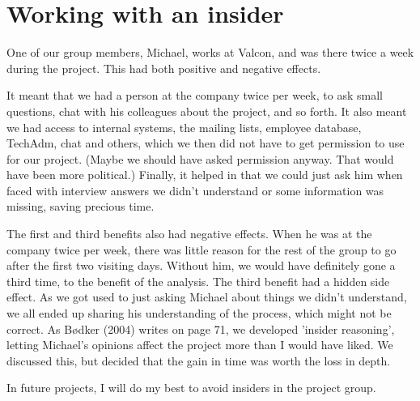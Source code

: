 \section{Working with an insider}
One of our group members, Michael, works at Valcon, and was there twice a week during the project.
This had both positive and negative effects.

It meant that we had a person at the company twice per week, to ask small questions, chat with his colleagues about the project, and so forth.
It also meant we had access to internal systems, the mailing lists, employee database, TechAdm, chat and others, which we then did not have to get permission to use for our project.
(Maybe we should have asked permission anyway. That would have been more political.)
Finally, it helped in that we could just ask him when faced with interview answers we didn't understand or some information was missing, saving precious time.

The first and third benefits also had negative effects.
When he was at the company twice per week, there was little reason for the rest of the group to go after the first two visiting days.
Without him, we would have definitely gone a third time, to the benefit of the analysis.
The third benefit had a hidden side effect.
As we got used to just asking Michael about things we didn't understand, we all ended up sharing his understanding of the process, which might not be correct.
As Bødker (2004) writes on page 71, we developed 'insider reasoning', letting Michael's opinions affect the project more than I would have liked.
We discussed this, but decided that the gain in time was worth the loss in depth.

In future projects, I will do my best to avoid insiders in the project group.